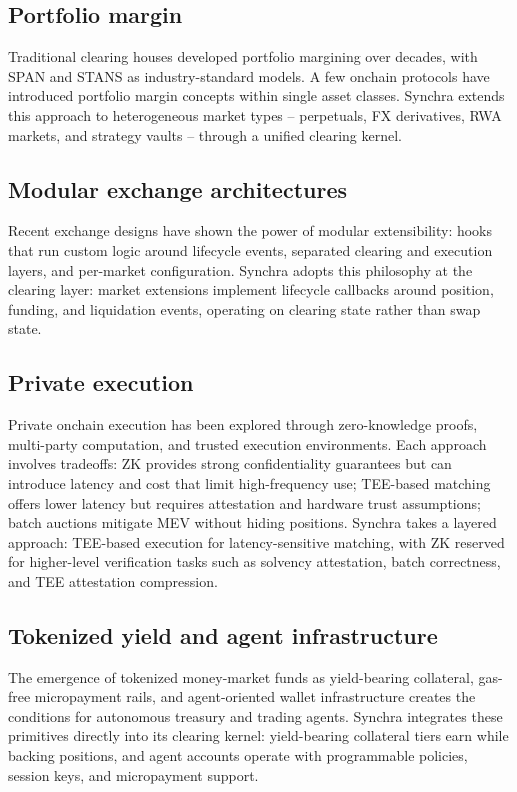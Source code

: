 \documentclass[11pt,a4paper]{article}
\begin{document}
\subsection{Portfolio margin}

Traditional clearing houses developed portfolio margining over decades, with SPAN and STANS as industry-standard models. A few onchain protocols have introduced portfolio margin concepts within single asset classes. Synchra extends this approach to heterogeneous market types -- perpetuals, FX derivatives, RWA markets, and strategy vaults -- through a unified clearing kernel.

\subsection{Modular exchange architectures}

Recent exchange designs have shown the power of modular extensibility: hooks that run custom logic around lifecycle events, separated clearing and execution layers, and per-market configuration. Synchra adopts this philosophy at the clearing layer: market extensions implement lifecycle callbacks around position, funding, and liquidation events, operating on clearing state rather than swap state.

\subsection{Private execution}

Private onchain execution has been explored through zero-knowledge proofs, multi-party computation, and trusted execution environments. Each approach involves tradeoffs: ZK provides strong confidentiality guarantees but can introduce latency and cost that limit high-frequency use; TEE-based matching offers lower latency but requires attestation and hardware trust assumptions; batch auctions mitigate MEV without hiding positions. Synchra takes a layered approach: TEE-based execution for latency-sensitive matching, with ZK reserved for higher-level verification tasks such as solvency attestation, batch correctness, and TEE attestation compression.

\subsection{Tokenized yield and agent infrastructure}

The emergence of tokenized money-market funds as yield-bearing collateral, gas-free micropayment rails, and agent-oriented wallet infrastructure creates the conditions for autonomous treasury and trading agents. Synchra integrates these primitives directly into its clearing kernel: yield-bearing collateral tiers earn while backing positions, and agent accounts operate with programmable policies, session keys, and micropayment support.
\end{document}
